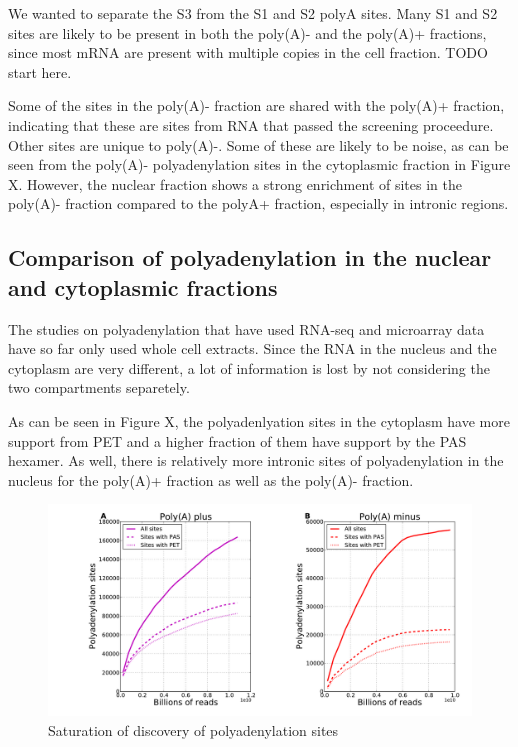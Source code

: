 We wanted to separate the S3 from the S1 and S2 polyA sites. Many S1 and S2 sites
are likely to be present in both the poly(A)- and the poly(A)+ fractions, since
most mRNA are present with multiple copies in the cell fraction. TODO start
here.

Some of the sites in the poly(A)- fraction are
shared with the poly(A)+ fraction, indicating that these are sites from RNA
that passed the screening proceedure.  Other sites are unique to poly(A)-. Some
of these are likely to be noise, as can be seen from the poly(A)-
polyadenylation sites in the cytoplasmic fraction in Figure X. However, the
nuclear fraction shows a strong enrichment of sites in the poly(A)- fraction
compared to the polyA+ fraction, especially in intronic regions.

\subsection{Comparison of polyadenylation in the nuclear and cytoplasmic
fractions}
The studies on polyadenylation that have used RNA-seq and microarray
data have so far only used whole cell extracts. Since the RNA in the nucleus
and the cytoplasm are very different, a lot of information is lost by not
considering the two compartments separetely. 

As can be seen in Figure X, the polyadenlyation sites in the cytoplasm have
more support from PET and a higher fraction of them have support by the PAS
hexamer. As well, there is relatively more intronic sites of polyadenylation in
the nucleus for the poly(A)+ fraction as well as the poly(A)- fraction.

\begin{figure}[htb]
	\begin{center}
		\includegraphics[scale=0.3]{figures/polyadenylation/Saturation_plot_2+.pdf}
	\end{center}
	\caption{Saturation of discovery of polyadenylation sites}
	\label{fig:saturation}
\end{figure}

